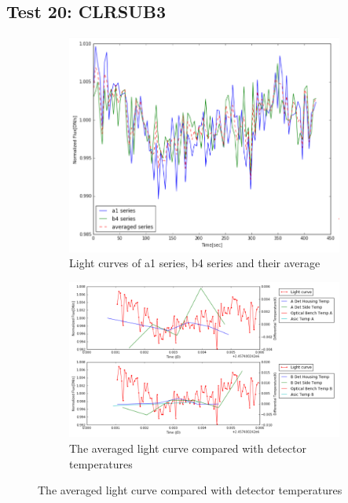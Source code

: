 \documentclass[conference]{IEEEtran}
\begin{document}
\subsection{Test 20: CLRSUB3} 
\begin{figure}[H]
    \centering
    \begin{subfigure}{1}
        \includegraphics[scale=0.4]{ts_test20}
        \caption{Light curves of a1 series, b4 series and their average}
    \end{subfigure}

    \begin{subfigure}{2}
        \includegraphics[scale=0.4]{temp_test20}
        \caption{The averaged light curve compared with detector temperatures}
    \end{subfigure}
   

\end{figure}
\end{document}

